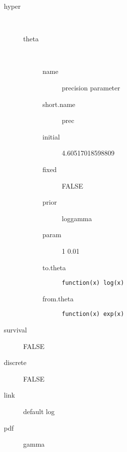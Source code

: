 \begin{description}
	\item[hyper]\ 
	 \begin{description}
	 	\item[theta]\ 
	 	 \begin{description}
	 	 	 \item[ name ] precision parameter 
	 	 	 \item[ short.name ] prec 
	 	 	 \item[ initial ] 4.60517018598809 
	 	 	 \item[ fixed ] FALSE 
	 	 	 \item[ prior ] loggamma 
	 	 	 \item[ param ] 1 0.01 
	 	 	 \item[ to.theta ] \verb|function(x) log(x)| 
	 	 	 \item[ from.theta ] \verb|function(x) exp(x)| 
	 	 \end{description}
	 \end{description}
	 \item[ survival ] FALSE 
	 \item[ discrete ] FALSE 
	 \item[ link ] default log 
	 \item[ pdf ] gamma 
\end{description}
